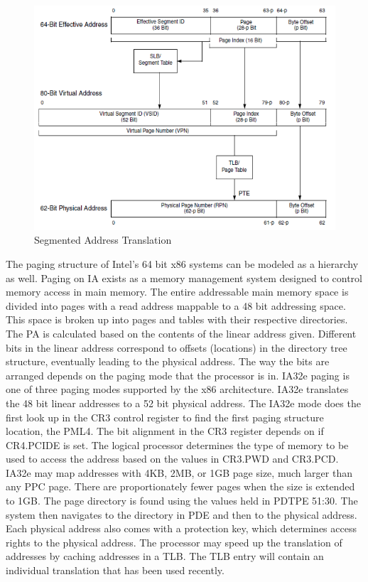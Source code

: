\documentclass[10pt]{article}
\begin{document}
\par
\begin{figure}[h]
   \centering
   \includegraphics[scale=0.5]{PPC_address}
   \caption{Segmented Address Translation}
\end{figure}
\par

The paging structure of Intel's 64 bit x86 systems can be modeled as a hierarchy as well. Paging on IA exists as a memory management system designed to control memory access in main memory. The entire addressable main memory space is divided into pages with a read address mappable to a 48 bit addressing space. This space is broken up into pages and tables with their respective directories. The PA is calculated based on the contents of the linear address given. Different bits in the linear address correspond to offsets (locations) in the directory tree structure, eventually leading to the physical address. The way the bits are arranged depends on the paging mode that the processor is in. IA32e paging is one of three paging modes supported by the x86 architecture. IA32e translates the 48 bit linear addresses to a 52 bit physical address. The IA32e mode does the first look up in the CR3 control register to find the first paging structure location, the PML4. The bit alignment in the CR3 register depends on if CR4.PCIDE is set. The logical processor determines the type of memory to be used to access the address based on the values in CR3.PWD and CR3.PCD. IA32e may map addresses with 4KB, 2MB, or 1GB page size, much larger than any PPC page. There are proportionately fewer pages when the size is extended to 1GB. The page directory is found using the values held in PDTPE 51:30. The system then navigates to the directory in PDE and then to the physical address. Each physical address also comes with a protection key, which determines access rights to the physical address. The processor may speed up the translation of addresses by caching addresses in a TLB. The TLB entry will contain an individual translation that has been used recently. 
\end{document}

